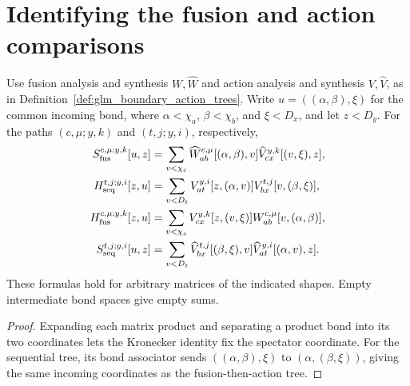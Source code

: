 \section{Identifying the fusion and action comparisons}
\label{sec:glm_mixed_comparison}

\begin{lemma}
    \leanok
    \label{thm:glm_action_tree_entries}
    Use fusion analysis and synthesis $W,\widehat W$ and action analysis
    and synthesis $V,\widehat V$, as in
    Definition~\ref{def:glm_boundary_action_trees}.
    Write $u=((\alpha,\beta),\xi)$ for the common incoming bond, where
    $\alpha<\chi_a$, $\beta<\chi_b$, and $\xi<D_x$, and let $z<D_y$.
    For the paths $(c,\mu;y,k)$ and $(t,j;y,i)$, respectively,
    \begin{align}
        S_{\rm fus}^{c,\mu;y,k}[u,z]
         & =\sum_{v<\chi_c}
        \widehat W_{ab}^{c,\mu}[(\alpha,\beta),v]
        \widehat V_{cx}^{y,k}[(v,\xi),z],\notag \\
        H_{\rm seq}^{t,j;y,i}[z,u]
         & =\sum_{v<D_t}
        V_{at}^{y,i}[z,(\alpha,v)]
        V_{bx}^{t,j}[v,(\beta,\xi)],\notag      \\
        H_{\rm fus}^{c,\mu;y,k}[z,u]
         & =\sum_{v<\chi_c}
        V_{cx}^{y,k}[z,(v,\xi)]
        W_{ab}^{c,\mu}[v,(\alpha,\beta)],\notag \\
        S_{\rm seq}^{t,j;y,i}[u,z]
         & =\sum_{v<D_t}
        \widehat V_{bx}^{t,j}[(\beta,\xi),v]
        \widehat V_{at}^{y,i}[(\alpha,v),z].
        \label{eq:glm_action_tree_entries}
    \end{align}
    These formulas hold for arbitrary matrices of the indicated shapes.
    Empty intermediate bond spaces give empty sums.
\end{lemma}
\begin{proof}
    \leanok
    Expanding each matrix product and separating a product bond into its two
    coordinates lets the Kronecker identity fix the spectator coordinate.
    For the sequential tree, its bond associator sends
    $((\alpha,\beta),\xi)$ to $(\alpha,(\beta,\xi))$, giving the same
    incoming coordinates as the fusion-then-action tree.
\end{proof}

